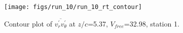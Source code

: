 \begin{figure}[H]
\centering
\texttt{[image: figs/run\_10/run\_10\_rt\_contour]}
\caption{Contour plot of $\overline{v_{r}^{\prime} v_{\theta}^{\prime}}$ at $z/c$=5.37, $V_{free}$=32.98, station 1.}
\label{fig:run_10_rt_contour}
\end{figure}


